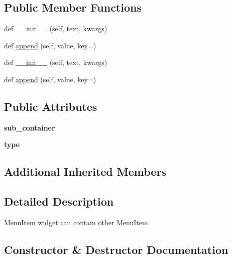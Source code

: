 \subsection*{Public Member Functions}
\begin{DoxyCompactItemize}
\item 
def \hyperlink{classremi_1_1gui_1_1MenuItem_a4d58be7f1ccce673cb5d13303c27f6dd}{\+\_\+\+\_\+init\+\_\+\+\_\+} (self, text, kwargs)
\item 
def \hyperlink{classremi_1_1gui_1_1MenuItem_a0c336dc4bc774be48421925a43d76bc0}{append} (self, value, key=\textquotesingle{}\textquotesingle{})
\item 
def \hyperlink{classremi_1_1gui_1_1MenuItem_a4d58be7f1ccce673cb5d13303c27f6dd}{\+\_\+\+\_\+init\+\_\+\+\_\+} (self, text, kwargs)
\item 
def \hyperlink{classremi_1_1gui_1_1MenuItem_a0c336dc4bc774be48421925a43d76bc0}{append} (self, value, key=\textquotesingle{}\textquotesingle{})
\end{DoxyCompactItemize}
\subsection*{Public Attributes}
\begin{DoxyCompactItemize}
\item 
{\bfseries sub\+\_\+container}\hypertarget{classremi_1_1gui_1_1MenuItem_a837df6dd5743c0a62aa9f171f5c41aa6}{}\label{classremi_1_1gui_1_1MenuItem_a837df6dd5743c0a62aa9f171f5c41aa6}

\item 
{\bfseries type}\hypertarget{classremi_1_1gui_1_1MenuItem_a180e4b5557efb5ade162d17d797c71f7}{}\label{classremi_1_1gui_1_1MenuItem_a180e4b5557efb5ade162d17d797c71f7}

\end{DoxyCompactItemize}
\subsection*{Additional Inherited Members}


\subsection{Detailed Description}
\begin{DoxyVerb}MenuItem widget can contain other MenuItem.\end{DoxyVerb}
 

\subsection{Constructor \& Destructor Documentation}
